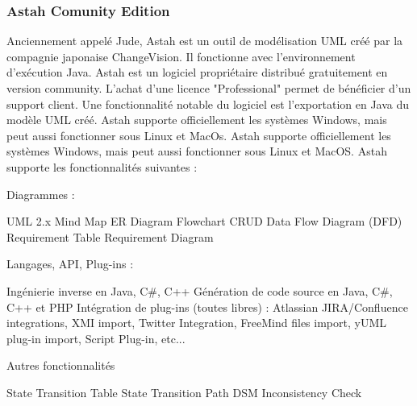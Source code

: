 \subsubsection{Astah Comunity Edition}
Anciennement appelé Jude, Astah est un outil de modélisation UML créé
par la compagnie japonaise ChangeVision. Il fonctionne avec l'environnement d'exécution Java.
Astah est un logiciel propriétaire distribué gratuitement en version community. L'achat d'une
licence "Professional" permet de bénéficier d'un support client. Une fonctionnalité notable du
logiciel est l'exportation en Java du modèle UML créé. Astah supporte officiellement les
systèmes Windows, mais peut aussi fonctionner sous Linux et MacOs. \cite{astah}
Astah supporte officiellement les systèmes Windows, mais peut aussi fonctionner sous Linux et MacOS.
Astah supporte les fonctionnalités suivantes :
\begin{itemize}
	\itemcheck Diagrammes : 
	\begin{itemize}
		\itemtirait UML 2.x
		\itemtirait Mind Map
		\itemtirait ER Diagram
		\itemtirait Flowchart
		\itemtirait CRUD
		\itemtirait Data Flow Diagram (DFD)
		\itemtirait Requirement Table
		\itemtirait Requirement Diagram
	\end{itemize}
	\itemcheck Langages, API, Plug-ins :
	\begin{itemize}
		\itemtirait Ingénierie inverse en Java, C\#, C++
		\itemtirait Génération de code source en Java, C\#, C++ et PHP
		\itemtirait Intégration de plug-ins (toutes libres) : Atlassian JIRA/Confluence integrations, XMI import, Twitter Integration, FreeMind files import, yUML plug-in import, Script Plug-in, etc...
	\end{itemize}
	\itemcheck Autres fonctionnalités 
	\begin{itemize}
		\itemtirait State Transition Table
		\itemtirait State Transition Path
		\itemtirait DSM
		\itemtirait Inconsistency Check
	\end{itemize}
\end{itemize}
